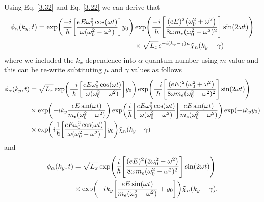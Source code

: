 Using Eq. \eqref{3.32} and Eq. \eqref{3.22} we can derive that
\begin{equation} \label{3.34}
  \begin{aligned}
    \phi_{\alpha}(k_y,t)  =
    \exp(
      \frac{-i}{\hbar}
      \qty[
      \frac{eE\omega_0^2\cos(\omega t)}{\omega(\omega_0^2 - \omega^2)}]y_0
    )&
    \exp(
      \frac{-i}{\hbar}
      \qty[
      \frac{(eE)^2\qty(\omega_0^2 + \omega^2)}{8\omega m_e(\omega_0^2 - \omega^2)^2}
      ]\sin(2\omega t)
    )
    \\
    & \times
    {\sqrt{L_x}} e^{-i \qty(k_y -\gamma)\mu}
    \tilde{\chi}_{n}\qty(k_y -\gamma)
  \end{aligned}
\end{equation}
where we included the $k_x$ dependence into $\alpha$ quantum number using $m$ value and this can be re-write subtituting $\mu$ and $\gamma$ values as follows
\begin{equation} \label{3.35}
  \begin{aligned}
    \phi_{\alpha}(k_y,t) & =
    {\sqrt{L_x}}
    \exp(
      \frac{-i}{\hbar}
      \qty[
      \frac{eE\omega_0^2\cos(\omega t)}{\omega(\omega_0^2 - \omega^2)}]y_0
    )
    \exp(
      \frac{-i}{\hbar}
      \qty[
      \frac{(eE)^2\qty(\omega_0^2 + \omega^2)}{8\omega m_e(\omega_0^2 - \omega^2)^2}
      ]\sin(2\omega t)
    ) \\
    & \times
    \exp(
      -ik_y  \frac{eE\sin(\omega t)}{m_e(\omega_0^2 - \omega^2)}
    )
    \exp(
      \frac{i}{\hbar}
      \qty[ \frac{eE\omega_0^2\cos(\omega t)}{\omega(\omega_0^2 - \omega^2)}]
      \frac{eE\sin(\omega t)}{m_e(\omega_0^2 - \omega^2)}
    )
    \exp(
      -i k_y y_0
    ) \\
    & \times
    \exp(
      i \frac{1}{\hbar}
      \qty[ \frac{eE\omega_0^2\cos(\omega t)}{\omega(\omega_0^2 - \omega^2)}]
      y_0
    )
    \tilde{\chi}_{n}\qty(k_y -\gamma)
  \end{aligned}
\end{equation}
and
\begin{equation} \label{3.36}
  \begin{aligned}
    \phi_{\alpha}(k_y,t) & =
    {\sqrt{L_x}}
    \exp(
      \frac{i}{\hbar}
      \qty[
      \frac{(eE)^2\qty(3\omega_0^2 - \omega^2)}{8\omega m_e(\omega_0^2 - \omega^2)^2}
      ]\sin(2\omega t)
    ) \\
    & \times
    \exp(
      -ik_y  \qty[\frac{eE\sin(\omega t)}{m_e(\omega_0^2 - \omega^2)} + y_0]
    )
    \tilde{\chi}_{n}\qty(k_y -\gamma).
  \end{aligned}
\end{equation}

